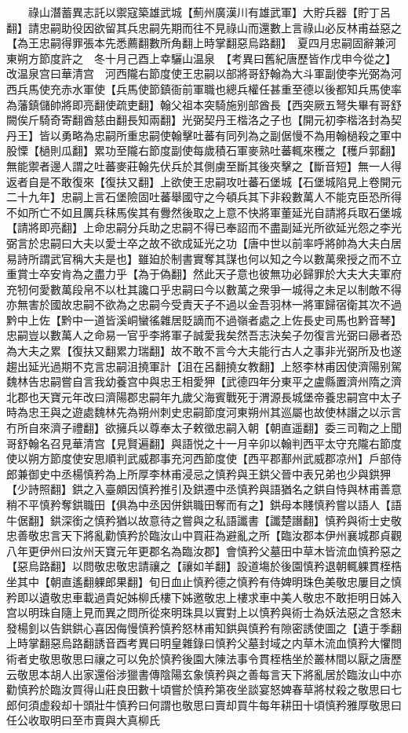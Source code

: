 　　祿山潛蓄異志託以禦寇築雄武城【薊州廣漢川有雄武軍】大貯兵器【貯丁呂翻】請忠嗣助役因欲留其兵忠嗣先期而往不見祿山而還數上言祿山必反林甫益惡之【為王忠嗣得罪張本先悉薦翻數所角翻上時掌翻惡烏路翻】　夏四月忠嗣固辭兼河東朔方節度許之　冬十月己酉上幸驪山温泉　【考異曰舊紀唐歷皆作戊申今從之】改温泉宫曰華清宫　河西隴右節度使王忠嗣以部將哥舒翰為大斗軍副使李光弼為河西兵馬使充赤水軍使【兵馬使節鎮衙前軍職也總兵權任甚重至德以後都知兵馬使率為藩鎮儲帥將即亮翻使疏吏翻】翰父祖本突騎施别部酋長【西突厥五弩失畢有哥舒闕俟斤騎奇寄翻酋慈由翻長知兩翻】光弼契丹王楷洛之子也【開元初李楷洛封為契丹王】皆以勇略為忠嗣所重忠嗣使翰擊吐蕃有同列為之副倨慢不為用翰檛殺之軍中股慄【檛則瓜翻】累功至隴右節度副使每歲積石軍麥熟吐蕃輒來穫之【穫戶郭翻】無能禦者邊人謂之吐蕃麥莊翰先伏兵於其側虜至斷其後夾擊之【斷音短】無一人得返者自是不敢復來【復扶又翻】上欲使王忠嗣攻吐蕃石堡城【石堡城陷見上卷開元二十九年】忠嗣上言石堡險固吐蕃舉國守之今頓兵其下非殺數萬人不能克臣恐所得不如所亡不如且厲兵秣馬俟其有釁然後取之上意不快將軍董延光自請將兵取石堡城【請將即亮翻】上命忠嗣分兵助之忠嗣不得已奉詔而不盡副延光所欲延光怨之李光弼言於忠嗣曰大夫以愛士卒之故不欲成延光之功【唐中世以前率呼將帥為大夫白居易詩所謂武官稱大夫是也】雖廹於制書實奪其謀也何以知之今以數萬衆授之而不立重賞士卒安肯為之盡力乎【為于偽翻】然此天子意也彼無功必歸罪於大夫大夫軍府充牣何愛數萬段帛不以杜其讒口乎忠嗣曰今以數萬之衆爭一城得之未足以制敵不得亦無害於國故忠嗣不欲為之忠嗣今受責天子不過以金吾羽林一將軍歸宿衛其次不過黔中上佐【黔中一道皆溪峒蠻徭雜居貶謫而不過嶺者處之上佐長史司馬也黔音琴】忠嗣豈以數萬人之命易一官乎李將軍子誠愛我矣然吾志決矣子勿復言光弼曰曏者恐為大夫之累【復扶又翻累力瑞翻】故不敢不言今大夫能行古人之事非光弼所及也遂趨出延光過期不克言忠嗣沮撓軍計【沮在呂翻撓女教翻】上怒李林甫因使濟陽别駕魏林告忠嗣嘗自言我幼養宫中與忠王相愛狎【武德四年分東平之盧縣置濟州隋之濟北郡也天寶元年改曰濟陽郡忠嗣年九歲父海賓戰死于渭源長城堡帝養忠嗣宫中太子時為忠王與之遊處魏林先為朔州刺史忠嗣節度河東朔州其巡屬也故使林譖之以示言冇所自來濟子禮翻】欲擁兵以尊奉太子敕徵忠嗣入朝【朝直遥翻】委三司鞫之上聞哥舒翰名召見華清宫【見賢遍翻】與語悦之十一月辛卯以翰判西平太守充隴右節度使以朔方節度使安思順判武威郡事充河西節度使【西平郡鄯州武威郡凉州】戶部侍郎兼御史中丞楊慎矜為上所厚李林甫浸忌之慎矜與王鉷父晉中表兄弟也少與鉷狎【少詩照翻】鉷之入臺頗因慎矜推引及鉷遷中丞慎矜與語猶名之鉷自恃與林甫善意稍不平慎矜奪鉷職田【俱為中丞因併鉷職田奪而有之】鉷母本賤慎矜嘗以語人【語牛倨翻】鉷深銜之慎矜猶以故意待之嘗與之私語讖書【讖楚譖翻】慎矜與術士史敬忠善敬忠言天下將亂勸慎矜於臨汝山中買莊為避亂之所【臨汝郡本伊州襄城郡貞觀八年更伊州曰汝州天寶元年更郡名為臨汝郡】會慎矜父墓田中草木皆流血慎矜惡之【惡烏路翻】以問敬忠敬忠請禳之【禳如羊翻】設道塲於後園慎矜退朝輒躶貫桎梏坐其中【朝直遙翻躶郎果翻】旬日血止慎矜德之慎矜有侍婢明珠色美敬忠屢目之慎矜即以遺敬忠車載過貴妃姊柳氏樓下姊邀敬忠上樓求車中美人敬忠不敢拒明日姊入宫以明珠自隨上見而異之問所從來明珠具以實對上以慎矜與術士為妖法惡之含怒未發楊釗以告鉷鉷心喜因侮慢慎矜慎矜怒林甫知鉷與慎矜有隙密誘使圖之【遺于季翻上時掌翻惡烏路翻誘音酉考異曰明皇雜錄曰慎矜父墓封域之内草木流血慎矜大懼問術者史敬思敬思曰禳之可以免於慎矜後園大陳法事令貫桎梏坐於叢林間以厭之唐歷云敬思本胡人出家還俗涉獵書傳陰陽玄象慎矜與之善每言天下將亂居於臨汝山中亦勸慎矜於臨汝買得山莊良田數十頃嘗於慎矜第夜坐談宴怒婢春草將杖殺之敬思曰七郎何須虚殺却十頭壯牛慎矜曰何謂也敬思曰賣却買牛每年耕田十頃慎矜雅厚敬思曰任公收取明曰至市賣與大真柳氏